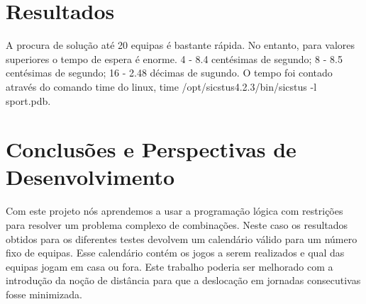 \documentclass[runningheads,a4paper]{llncs}
\begin{document}
\section{Resultados}
A procura de solução até 20 equipas é bastante rápida. No entanto, para valores superiores o tempo de espera é enorme. 4 - 8.4 centésimas de segundo; 8 - 8.5 centésimas de segundo; 16 - 2.48 décimas de sugundo. O tempo foi contado através do comando time do linux, time /opt/sicstus4.2.3/bin/sicstus -l sport.pdb.

\section{Conclusões e Perspectivas de Desenvolvimento}
Com este projeto nós aprendemos a usar a programação lógica com restrições para resolver um problema complexo de combinações. Neste caso os resultados obtidos para os diferentes testes devolvem um calendário válido para um número fixo de equipas. Esse calendário contém os jogos a serem realizados e qual das equipas jogam em casa ou fora. Este trabalho poderia ser melhorado com a introdução da noção de distância para que a deslocação em jornadas consecutivas fosse minimizada.
\end{document}
